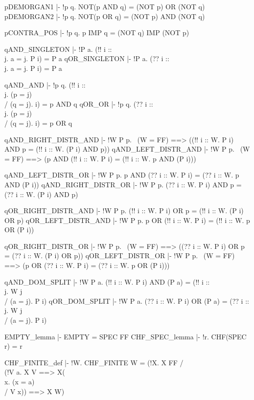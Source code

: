   pDEMORGAN1      |- !p q. NOT(p AND q) = (NOT p) OR (NOT q)
  pDEMORGAN2      |- !p q. NOT(p OR q) = (NOT p) AND (NOT q)

  pCONTRA_POS     |- !p q. p IMP q = (NOT q) IMP (NOT p)

  qAND_SINGLETON  |- !P a. (!! i :: \\j. a = j. P i) = P a
  qOR_SINGLETON   |- !P a. (?? i :: \\j. a = j. P i) = P a

  qAND_AND        |- !p q. (!! i :: \\j. (p = j) \\/ (q = j). i) = p AND q
  qOR_OR          |- !p q. (?? i :: \\j. (p = j) \\/ (q = j). i) = p OR q

  qAND_RIGHT_DISTR_AND
                  |- !W P p. ~(W = FF) ==>
                     ((!! i :: W. P i) AND p = (!! i :: W. (P i) AND p))
  qAND_LEFT_DISTR_AND
                  |- !W P p.
                     ~(W = FF) ==>
                     (p AND (!! i :: W. P i) = (!! i :: W. p AND (P i)))

  qAND_LEFT_DISTR_OR
                  |- !W P p. p AND (?? i :: W. P i) = (?? i :: W. p AND (P i))
  qAND_RIGHT_DISTR_OR
                  |- !W P p. (?? i :: W. P i) AND p = (?? i :: W. (P i) AND p)

  qOR_RIGHT_DISTR_AND
                  |- !W P p. (!! i :: W. P i) OR p = (!! i :: W. (P i) OR p)
  qOR_LEFT_DISTR_AND
                  |- !W P p. p OR (!! i :: W. P i) = (!! i :: W. p OR (P i))

  qOR_RIGHT_DISTR_OR
                  |- !W P p. ~(W = FF) ==> 
                     ((?? i :: W. P i) OR p = (?? i :: W. (P i) OR p))
  qOR_LEFT_DISTR_OR
                  |- !W P p. ~(W = FF) ==> 
                     (p OR (?? i :: W. P i) = (?? i :: W. p OR (P i)))

  qAND_DOM_SPLIT  |- !W P a. (!! i :: W. P i) AND (P a) = 
                             (!! i :: \\j. W j \\/ (a = j). P i)
  qOR_DOM_SPLIT   |- !W P a. (?? i :: W. P i) OR (P a) = 
                             (?? i :: \\j. W j \\/ (a = j). P i)


  EMPTY_lemma     |- EMPTY = SPEC FF
  CHF_SPEC_lemma  |- !r. CHF(SPEC r) = r

  CHF_FINITE_def  |- !W. CHF_FINITE W =
                       (!X. X FF /\\ (!V a. X V ==> X(\\x. (x = a) \\/ V x))
                        ==> X W)

